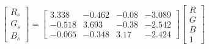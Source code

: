 \begin{equation}
\begin{bmatrix}
  R_s \\ G_s \\ B_s 
\end{bmatrix}=
\left[\begin{matrix}3.338 & -0.462 & -0.08 & -3.089\\ 
-0.518 & 3.693 & -0.38 & -2.542\\ 
-0.065 & -0.348 & 3.17 & -2.424\end{matrix}\right]
\begin{bmatrix}
  R \\ G \\ B \\ 1 
\end{bmatrix}
\end{equation}
